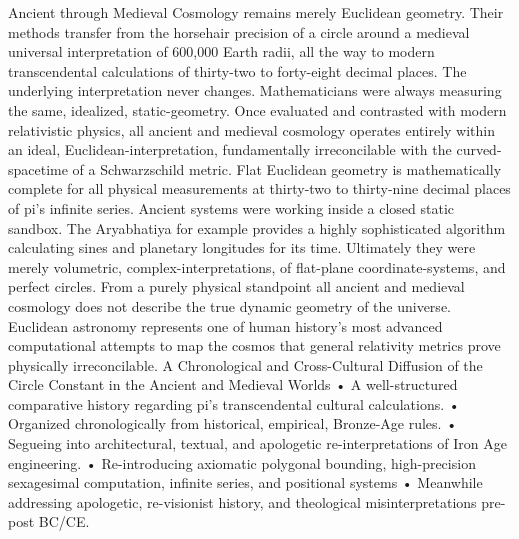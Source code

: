 {Ancient through Medieval Cosmology remains merely Euclidean geometry. Their methods transfer from the horsehair precision of a circle around a medieval universal interpretation of 600,000 Earth radii, all the way to modern transcendental calculations of thirty-two to forty-eight decimal places. The underlying interpretation never changes. Mathematicians were always measuring the same, idealized, static-geometry. Once evaluated and contrasted with modern relativistic physics, all ancient and medieval cosmology operates entirely within an ideal, Euclidean-interpretation, fundamentally irreconcilable with the curved-spacetime of a Schwarzschild metric. Flat Euclidean geometry is mathematically complete for all physical measurements at thirty-two to thirty-nine decimal places of pi’s infinite series. Ancient systems were working inside a closed static sandbox. The Aryabhatiya for example provides a highly sophisticated algorithm calculating sines and planetary longitudes for its time. Ultimately they were merely volumetric, complex-interpretations, of flat-plane coordinate-systems, and perfect circles. From a purely physical standpoint all ancient and medieval cosmology does not describe the true dynamic geometry of the universe. Euclidean astronomy represents one of human history’s most advanced computational attempts to map the cosmos that general relativity metrics prove physically irreconcilable. 
A Chronological and Cross-Cultural Diffusion of the Circle Constant in the Ancient and Medieval Worlds
•	A well-structured comparative history regarding pi’s transcendental cultural calculations. 
•	Organized chronologically from historical, empirical, Bronze-Age rules. 
•	Segueing into architectural, textual, and apologetic re-interpretations of Iron Age engineering. 
•	Re-introducing axiomatic polygonal bounding, high-precision sexagesimal computation, infinite series, and positional systems
•	Meanwhile addressing apologetic, re-visionist history, and theological misinterpretations pre-post BC/CE. 
}
